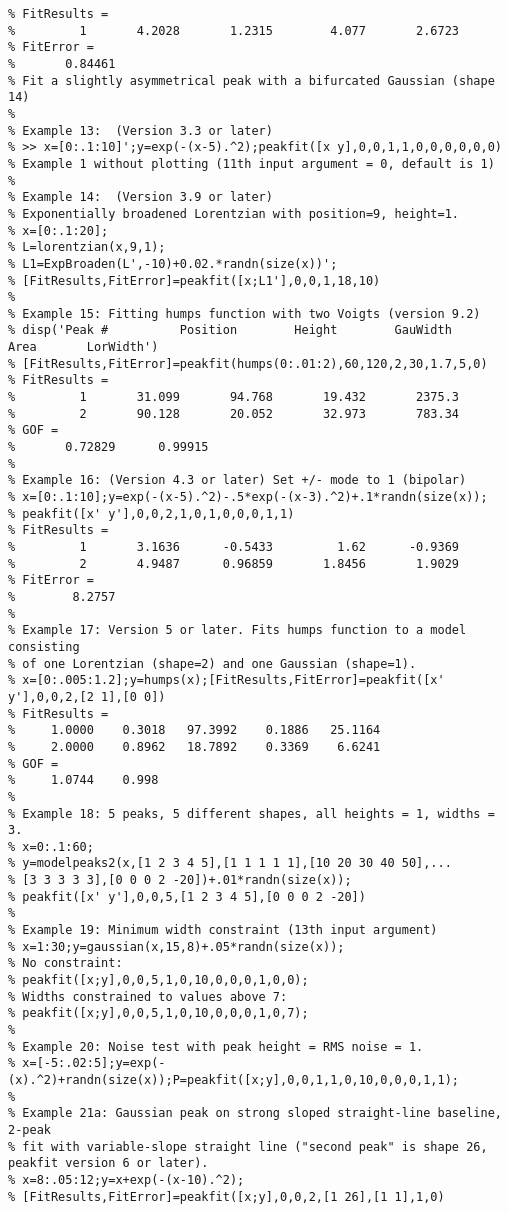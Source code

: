 \begin{lstlisting}
% FitResults =
%         1       4.2028       1.2315        4.077       2.6723
% FitError =
%       0.84461
% Fit a slightly asymmetrical peak with a bifurcated Gaussian (shape 14)
% 
% Example 13:  (Version 3.3 or later)
% >> x=[0:.1:10]';y=exp(-(x-5).^2);peakfit([x y],0,0,1,1,0,0,0,0,0,0)
% Example 1 without plotting (11th input argument = 0, default is 1)
% 
% Example 14:  (Version 3.9 or later)
% Exponentially broadened Lorentzian with position=9, height=1.
% x=[0:.1:20]; 
% L=lorentzian(x,9,1);
% L1=ExpBroaden(L',-10)+0.02.*randn(size(x))';
% [FitResults,FitError]=peakfit([x;L1'],0,0,1,18,10)
%
% Example 15: Fitting humps function with two Voigts (version 9.2)
% disp('Peak #          Position        Height        GauWidth          Area       LorWidth')
% [FitResults,FitError]=peakfit(humps(0:.01:2),60,120,2,30,1.7,5,0)
% FitResults =
%         1       31.099       94.768       19.432       2375.3
%         2       90.128       20.052       32.973       783.34
% GOF =
%       0.72829      0.99915
%
% Example 16: (Version 4.3 or later) Set +/- mode to 1 (bipolar)
% x=[0:.1:10];y=exp(-(x-5).^2)-.5*exp(-(x-3).^2)+.1*randn(size(x));
% peakfit([x' y'],0,0,2,1,0,1,0,0,0,1,1)
% FitResults =
%         1       3.1636      -0.5433         1.62      -0.9369
%         2       4.9487      0.96859       1.8456       1.9029
% FitError =
%        8.2757
%
% Example 17: Version 5 or later. Fits humps function to a model consisting 
% of one Lorentzian (shape=2) and one Gaussian (shape=1). 
% x=[0:.005:1.2];y=humps(x);[FitResults,FitError]=peakfit([x' y'],0,0,2,[2 1],[0 0])
% FitResults =
%     1.0000    0.3018   97.3992    0.1886   25.1164
%     2.0000    0.8962   18.7892    0.3369    6.6241
% GOF =
%     1.0744    0.998
%
% Example 18: 5 peaks, 5 different shapes, all heights = 1, widths = 3.
% x=0:.1:60;
% y=modelpeaks2(x,[1 2 3 4 5],[1 1 1 1 1],[10 20 30 40 50],...
% [3 3 3 3 3],[0 0 0 2 -20])+.01*randn(size(x));
% peakfit([x' y'],0,0,5,[1 2 3 4 5],[0 0 0 2 -20])
%
% Example 19: Minimum width constraint (13th input argument)
% x=1:30;y=gaussian(x,15,8)+.05*randn(size(x));
% No constraint:
% peakfit([x;y],0,0,5,1,0,10,0,0,0,1,0,0);
% Widths constrained to values above 7:
% peakfit([x;y],0,0,5,1,0,10,0,0,0,1,0,7);
%
% Example 20: Noise test with peak height = RMS noise = 1.
% x=[-5:.02:5];y=exp(-(x).^2)+randn(size(x));P=peakfit([x;y],0,0,1,1,0,10,0,0,0,1,1);
%
% Example 21a: Gaussian peak on strong sloped straight-line baseline, 2-peak
% fit with variable-slope straight line ("second peak" is shape 26, peakfit version 6 or later).
% x=8:.05:12;y=x+exp(-(x-10).^2);
% [FitResults,FitError]=peakfit([x;y],0,0,2,[1 26],[1 1],1,0)

\end{lstlisting}
